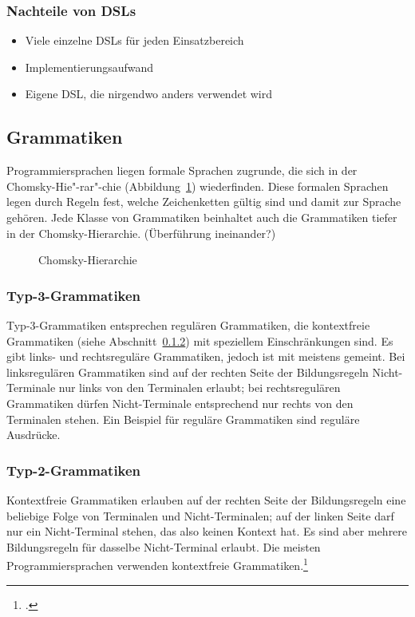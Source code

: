 \documentclass[../InterneDSLs.tex]{subfiles}
\begin{document}
\subsubsection{Nachteile von DSLs}
\begin{itemize}
	\item Viele einzelne DSLs für jeden Einsatzbereich
	\item Implementierungsaufwand
	\item Eigene DSL, die nirgendwo anders verwendet wird
\end{itemize}


\subsection{Grammatiken}
Programmiersprachen liegen formale Sprachen zugrunde, die sich in der Chomsky-Hie"-rar"-chie (Abbildung~\ref{fig:chomkskyhierarchie}) wiederfinden. Diese formalen Sprachen legen durch Regeln fest, welche Zeichenketten gültig sind und damit zur Sprache gehören. Jede Klasse von Grammatiken beinhaltet auch die Grammatiken tiefer in der Chomsky-Hierarchie. (Überführung ineinander?)

\begin{figure}
\centering
\def\svgwidth{0.5\textwidth}

\caption{Chomsky-Hierarchie}
\label{fig:chomkskyhierarchie}
\end{figure}

\subsubsection{Typ-3-Grammatiken}\label{sec:refulaeregrammatik}
Typ-3-Grammatiken entsprechen regulären Grammatiken, die kontextfreie Grammatiken (siehe Abschnitt~\ref{sec:kontextfreiegrammatik}) mit speziellem Einschränkungen sind. Es gibt links- und rechtsreguläre Grammatiken, jedoch ist mit  meistens  gemeint. Bei linksregulären Grammatiken sind auf der rechten Seite der Bildungsregeln Nicht-Terminale nur links von den Terminalen erlaubt; bei rechtsregulären Grammatiken dürfen Nicht-Terminale entsprechend nur rechts von den Terminalen stehen. Ein Beispiel für reguläre Grammatiken sind reguläre Ausdrücke.

\subsubsection{Typ-2-Grammatiken}\label{sec:kontextfreiegrammatik}
Kontextfreie Grammatiken erlauben auf der rechten Seite der Bildungsregeln eine beliebige Folge von Terminalen und Nicht-Terminalen; auf der linken Seite darf nur ein Nicht-Terminal stehen, das also keinen Kontext hat. Es sind aber mehrere Bildungsregeln für dasselbe Nicht-Terminal erlaubt. Die meisten Programmiersprachen verwenden kontextfreie Grammatiken.\footcite{Fowler.2010}
\end{document}
